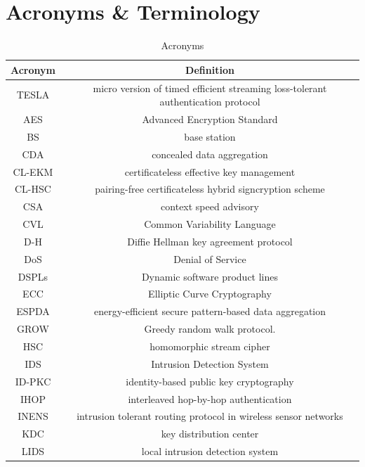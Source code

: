\documentclass[12pt,a4paper,twoside]{report}
\begin{document}
\section{Acronyms \& Terminology}
\FloatBarrier
\begin{table}[H]
    \caption{Acronyms}
  	\begin{center}
    \begin{tabular}{|c|c|} \hline
	        Acronym & Definition \\ \hline\hline
	        \si{\micro}TESLA & micro version of timed efficient streaming loss-tolerant authentication protocol\\ \hline
	        AES & Advanced Encryption Standard \\ \hline
	        BS & base station \\ \hline
	        CDA & concealed data aggregation  \\ \hline
	        CL-EKM & certificateless effective key management \\ \hline
	        CL-HSC & pairing-free certificateless hybrid signcryption scheme \\ \hline
	        CSA & context speed advisory \\ \hline
	        CVL & Common Variability Language \\ \hline
	        D-H & Diffie Hellman key agreement protocol \\ \hline
	        DoS & Denial of Service \\ \hline
	        DSPLs & Dynamic software product lines \\ \hline
	        ECC & Elliptic Curve Cryptography  \\ \hline
	        ESPDA & energy-efficient secure pattern-based data aggregation \\ \hline
	        GROW & Greedy random walk protocol. \\ \hline
	        HSC & homomorphic stream cipher\\ \hline
	        IDS & Intrusion Detection System \\ \hline
	        ID-PKC & identity-based public key cryptography  \\ \hline
	        IHOP & interleaved hop-by-hop authentication \\ \hline
	        INENS & intrusion tolerant routing protocol in wireless sensor networks \\ \hline
	        KDC & key distribution center \\ \hline
	        LIDS & local intrusion detection system \\ \hline

\end{tabular}
\end{center}
\end{table}
\end{document}
